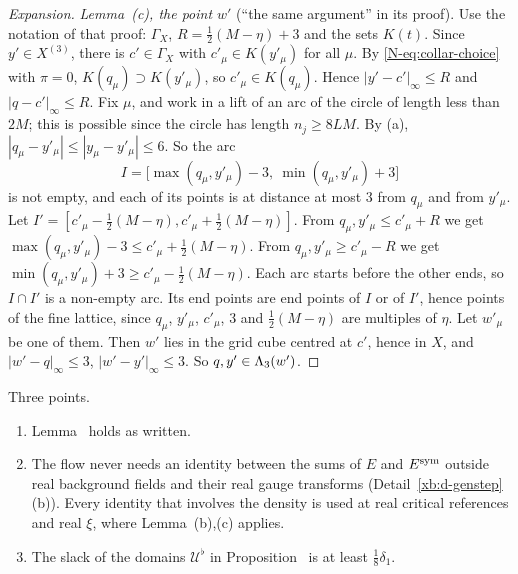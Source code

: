 \begin{proof}[Expansion]
\emph{Lemma~(c), the point $w'$} (``the same argument'' in its proof). Use the notation of that proof: $\Gamma_X$, $R=\frac12(M-\eta)+3$ and the sets $K(t)$. Since $y'\in X^{(3)}$, there is $c'\in\Gamma_X$ with $c'_\mu\in K(y'_\mu)$ for all $\mu$. By \eqref{N-eq:collar-choice} with $\pi=0$, $K(q_\mu)\supset K(y'_\mu)$, so $c'_\mu\in K(q_\mu)$. Hence $|y'-c'|_\infty\le R$ and $|q-c'|_\infty\le R$. Fix $\mu$, and work in a lift of an arc of the circle of length less than $2M$; this is possible since the circle has length $n_j\ge8LM$. By (a), $|q_\mu-y'_\mu|\le|y_\mu-y'_\mu|\le6$. So the arc
\[
I=\big[\max(q_\mu,y'_\mu)-3,\ \min(q_\mu,y'_\mu)+3\big]
\]
is not empty, and each of its points is at distance at most $3$ from $q_\mu$ and from $y'_\mu$. Let $I'=[c'_\mu-\frac12(M-\eta),c'_\mu+\frac12(M-\eta)]$. From $q_\mu,y'_\mu\le c'_\mu+R$ we get $\max(q_\mu,y'_\mu)-3\le c'_\mu+\frac12(M-\eta)$. From $q_\mu,y'_\mu\ge c'_\mu-R$ we get $\min(q_\mu,y'_\mu)+3\ge c'_\mu-\frac12(M-\eta)$. Each arc starts before the other ends, so $I\cap I'$ is a non-empty arc. Its end points are end points of $I$ or of $I'$, hence points of the fine lattice, since $q_\mu$, $y'_\mu$, $c'_\mu$, $3$ and $\frac12(M-\eta)$ are multiples of $\eta$. Let $w'_\mu$ be one of them. Then $w'$ lies in the grid cube centred at $c'$, hence in $X$, and $|w'-q|_\infty\le3$, $|w'-y'|_\infty\le3$. So $q,y'\in\Lambda_3(w')$.
\end{proof}

\begin{detail}\label{xb:d-symflow}
Three points.
\begin{enumerate}[label=(\alph*)]
\item Lemma~ holds as written.
\item The flow never needs an identity between the sums of $E$ and $E^{\rm sym}$ outside real background fields and their real gauge transforms (Detail~\ref{xb:d-genstep}(b)). Every identity that involves the density is used at real critical references and real $\xi$, where Lemma~(b),(c) applies.
\item The slack of the domains $\mathcal U^\flat$ in Proposition~ is at least $\frac18\delta_1$.
\end{enumerate}
\end{detail}


